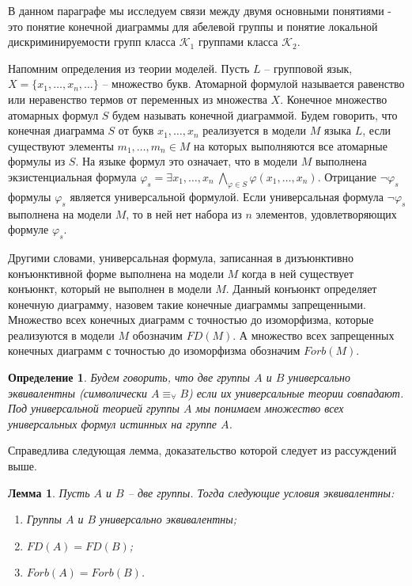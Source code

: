 \documentclass[a4paper,11pt,twoside]{article}
\newtheorem{lemma}{Лемма}[section]
\newtheorem{definition}{Определение}[section]
\def\K{{\mathcal{K}}}
\begin{document}
В данном параграфе мы исследуем связи между двумя основными понятиями - это понятие конечной диаграммы для абелевой группы и понятие локальной дискриминируемости групп класса $\K_1$ группами класса $\K_2$.

Напомним определения из теории моделей. Пусть $L$ -- групповой язык, $X = \{x_1, \ldots, x_n, \ldots\}$ -- множество букв. Атомарной формулой называется равенство или неравенство термов от переменных из множества $X$. Конечное множество атомарных формул $S$ будем называть конечной диаграммой. Будем говорить, что конечная диаграмма $S$ от букв $x_1, \ldots, x_n$ реализуется в модели $M$ языка $L$, если существуют элементы $m_1, \ldots, m_n \in M$ на которых выполняются все атомарные формулы из $S$. На языке формул это означает, что в модели $M$ выполнена экзистенциальная формула $\varphi_s = \exists x_1, \ldots, x_n \ \bigwedge\limits_{\varphi \in S} \varphi(x_1, \ldots, x_n)$. Отрицание $\neg\varphi_s$ формулы $\varphi_s$ является универсальной формулой. Если универсальная формула $\neg\varphi_s$ выполнена на модели $M$, то в ней нет набора из $n$ элементов, удовлетворяющих формуле $\varphi_s$. 

Другими словами, универсальная формула, записанная в дизъюнктивно конъюнктивной форме выполнена на модели $M$ когда в ней существует конъюнкт, который не выполнен в модели $M$. Данный конъюнкт определяет конечную диаграмму, назовем такие конечные диаграммы запрещенными. Множество всех конечных диаграмм с точностью до изоморфизма, которые реализуются в модели $M$ обозначим $FD(M)$. А множество всех запрещенных конечных диаграмм с точностью до изоморфизма обозначим $Forb(M)$. 

\begin{definition}
Будем говорить, что две группы $A$ и $B$ универсально эквивалентны (символически $A \equiv_\forall B$) если их универсальные теории совпадают. Под универсальной теорией группы $A$ мы понимаем множество всех универсальных формул истинных на группе $A$.
\end{definition}
Справедлива следующая лемма, доказательство которой следует из рассуждений выше.

\begin{lemma}
Пусть $A$ и $B$ -- две группы. Тогда следующие условия эквивалентны:
\begin{enumerate}
\item Группы $A$ и $B$ универсально эквивалентны;
\item $FD(A) = FD(B)$;
\item $Forb(A) = Forb(B)$.
\end{enumerate}
\end{lemma}
\end{document}

